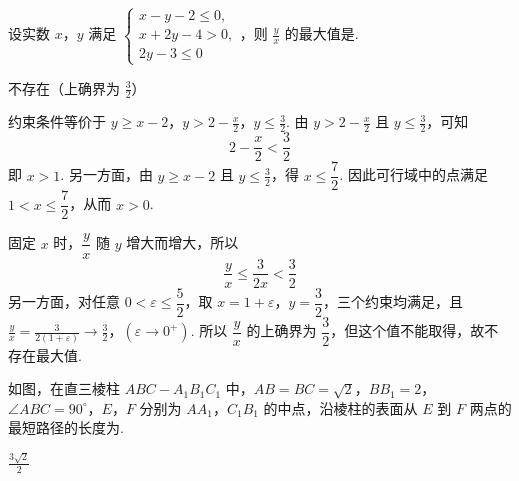 \begin{problem}
设实数 \(x\)，\(y\) 满足 \(\begin{cases}
x-y-2\leqslant 0,\\
 x+2y-4>0,\\
2y-3\leqslant 0
\end{cases}\)，则 \(\frac{y}{x}\) 的最大值是\fillinblank{}.
\end{problem}

\begin{answer}不存在（上确界为 \(\frac{3}{2}\)）\end{answer}

\begin{solution}
约束条件等价于
\(y\geqslant x-2\)，\(y>2-\frac{x}{2}\)，\(y\leqslant\frac32\).
由 \(y>2-\frac{x}{2}\) 且 \(y\leqslant\frac32\)，可知
\[
2-\frac{x}{2}<\frac32
\]
即 \(x>1\). 另一方面，由 \(y\geqslant x-2\) 且 \(y\leqslant\frac32\)，得 \(x\leqslant\dfrac72\). 因此可行域中的点满足 \(1<x\leqslant\dfrac72\)，从而 \(x>0\).

固定 \(x\) 时，\(\dfrac yx\) 随 \(y\) 增大而增大，所以
\[
\frac yx\leqslant\frac{3}{2x}<\frac32
\]
另一方面，对任意 \(0<\varepsilon\leqslant\dfrac52\)，取 \(x=1+\varepsilon\)，\(y=\dfrac32\)，三个约束均满足，且
\(\frac yx=\frac{3}{2(1+\varepsilon)}\longrightarrow\frac32\)，\((\varepsilon\to0^+)\).
所以 \(\dfrac yx\) 的上确界为 \(\dfrac32\)，但这个值不能取得，故不存在最大值.
\end{solution}

\begin{problem}
如图，在直三棱柱 \(ABC-A_{1}B_{1}C_{1}\) 中，\(AB=BC=\sqrt{2}\)，\(BB_{1}=2\)，\(\angle ABC=90^{\circ}\)，\(E\)，\(F\) 分别为 \(AA_{1}\)，\(C_{1}B_{1}\) 的中点，沿棱柱的表面从 \(E\) 到 \(F\) 两点的最短路径的长度为\fillinblank{}.

\end{problem}

\begin{answer}\(\frac{3\sqrt{2}}{2}\)\end{answer}

